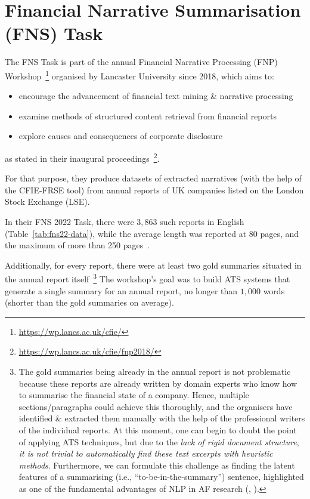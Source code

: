 \section{Financial Narrative Summarisation (FNS) Task} \label{sec:fns}
The FNS Task is part of the annual Financial Narrative Processing (FNP) Workshop~\footnote{\url{https://wp.lancs.ac.uk/cfie/}} organised by Lancaster University since 2018, which aims to:
\begin{itemize}
    \item encourage the advancement of financial text mining \& narrative processing
    \item examine methods of structured content retrieval from financial reports
    \item explore causes and consequences of corporate disclosure
\end{itemize} as stated in their inaugural proceedings~\footnote{\url{https://wp.lancs.ac.uk/cfie/fnp2018/}}.

For that purpose, they produce datasets of extracted narratives (with the help of the CFIE-FRSE tool) from annual reports of UK companies listed on the London Stock Exchange (LSE).

In their FNS 2022 Task, there were $3,863$ such reports in English (Table~\ref{tab:fns22-data}), while the average length was reported at 80 pages, and the maximum of more than 250 pages~\cite{litvak-vanetik-2021-summarization}.

Additionally, for every report, there were at least two gold summaries situated in the annual report itself~\footnote{
    The gold summaries being already in the annual report is not problematic because these reports are already written by domain experts who know how to summarise the financial state of a company.
    Hence, multiple sections/paragraphs could achieve this thoroughly, and the organisers have identified \& extracted them manually with the help of the professional writers of the individual reports.
    At this moment, one can begin to doubt the point of applying ATS techniques, but due to the \emph{lack of rigid document structure}, \emph{it is not trivial to automatically find these text excerpts with heuristic methods}.
    Furthermore, we can formulate this challenge as finding the latent features of a summarising (i.e., \enquote{to-be-in-the-summary}) sentence, highlighted as one of the fundamental advantages of NLP in AF research (\cite{lewis_young_2019}, \cite{el-haj2019meaning}).
}
The workshop's goal was to build ATS systems that generate a single summary for an annual report, no longer than $1,000$ words (shorter than the gold summaries on average).

